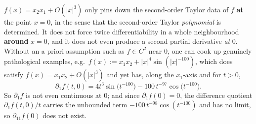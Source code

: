 \begin{exercisesolution}
\begin{enumerate}[label=\textbf{(\alph*)}]
    $f(x) = x_2x_1 + O(|x|^3)$ only pins down the second-order Taylor data of $f$ \textbf{at} the
    point $x=0$, in the sense that the second-order Taylor \emph{polynomial} is determined. It
    does not force twice differentiability in a whole
    neighbourhood \textbf{around} $x=0$, and it does not even produce a second partial derivative
    \emph{at} $0$. Without an a priori assumption such as $f \in C^2$ near
    $0$, one can cook up genuinely pathological examples, e.g.\
    $f(x) := x_1x_2 + |x|^4\sin(|x|^{-100})$, which does satisfy $f(x) = x_1x_2 + O(|x|^3)$ and
    yet has, along the $x_1$-axis and for $t>0$,
    \[\partial_1 f(t,0) = 4t^3\sin\!\big(t^{-100}\big)
      - 100\,t^{-97}\cos\!\big(t^{-100}\big).\]
    So $\partial_1 f$ is not even continuous at $0$; and since $\partial_1f(0)=0$, the
    difference quotient $\partial_1f(t,0)/t$ carries the unbounded term
    $-100\,t^{-98}\cos(t^{-100})$ and has no limit, so $\partial_{11}f(0)$ does not exist.
\end{enumerate}
\end{exercisesolution}

